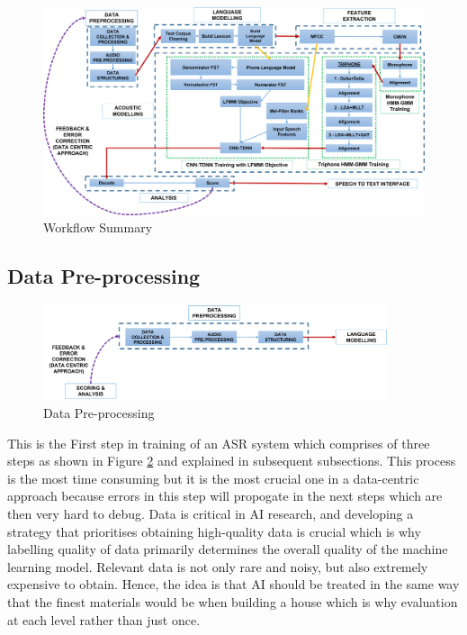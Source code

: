 \documentclass[3p,times]{elsarticle}
\begin{document}
\begin{figure}[h]
    \centering
    \includegraphics[width=1.0\textwidth]{img/workflow.png}
    \caption{Workflow Summary}
    \label{fig:workflow}
\end{figure}

\subsection{Data Pre-processing}

\begin{figure}[h]
    \centering
    \includegraphics[width=0.9\textwidth]{img/workflow-1.png}
    \caption{Data Pre-processing}
    \label{fig:working_pipeline-1}
\end{figure}

This is the First step in training of an ASR system which comprises of three steps as shown in Figure \ref{fig:working_pipeline-1} and explained in subsequent subsections. This process is the most time consuming but it is the most crucial one in a data-centric approach because errors in this step will propogate in the next steps which are then very hard to debug. Data is critical in AI research, and developing a strategy that prioritises obtaining high-quality data is crucial which is why labelling quality of data primarily determines the overall quality of the machine learning model. Relevant data is not only rare and noisy, but also extremely expensive to obtain. Hence, the idea is that AI should be treated in the same way that the finest materials would be when building a house which is why evaluation at each level rather than just once. 
\end{document}
